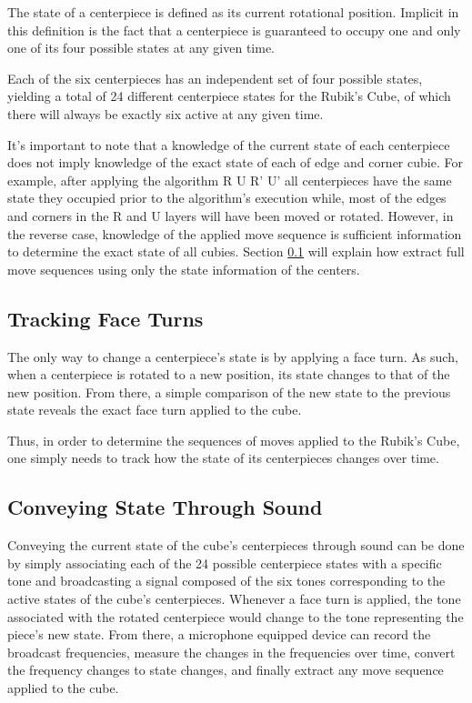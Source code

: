 The state of a centerpiece is defined as its current rotational position. 
Implicit in this definition is the fact that a centerpiece is guaranteed to occupy one and only one of its four possible states at any given time.

Each of the six centerpieces has an independent set of four possible states, yielding a total of 24 different centerpiece states for the Rubik's Cube, of which there will always be exactly six active at any given time.

It's important to note that a knowledge of the current state of each centerpiece does not imply knowledge of the exact state of each of edge and corner cubie.
For example, after applying the algorithm R U R' U' all centerpieces have the same state they occupied prior to the algorithm's execution while, most of the edges and corners in the R and U layers will have been moved or rotated.
However, in the reverse case, knowledge of the applied move sequence is sufficient information to determine the exact state of all cubies.
Section \ref{subsec:tracking-face-turns} will explain how extract full move sequences using only the state information of the centers.

\subsection{Tracking Face Turns}
\label{subsec:tracking-face-turns}
The only way to change a centerpiece's state is by applying a face turn.
As such, when a centerpiece is rotated to a new position, its state changes to that of the new position.
From there, a simple comparison of the new state to the previous state reveals the exact face turn applied to the cube.

Thus, in order to determine the sequences of moves applied to the Rubik's Cube, one simply needs to track how the state of its centerpieces changes over time. 

\subsection{Conveying State Through Sound}
\label{subsec:conveying-state-through-sound}
Conveying the current state of the cube's centerpieces through sound can be done by simply associating each of the 24 possible centerpiece states with a specific tone and broadcasting a signal composed of the six tones corresponding to the active states of the cube's centerpieces.
Whenever a face turn is applied, the tone associated with the rotated centerpiece would change to the tone representing the piece's new state.
From there, a microphone equipped device can record the broadcast frequencies, measure the changes in the frequencies over time, convert the frequency changes to state changes, and finally extract any move sequence applied to the cube.


